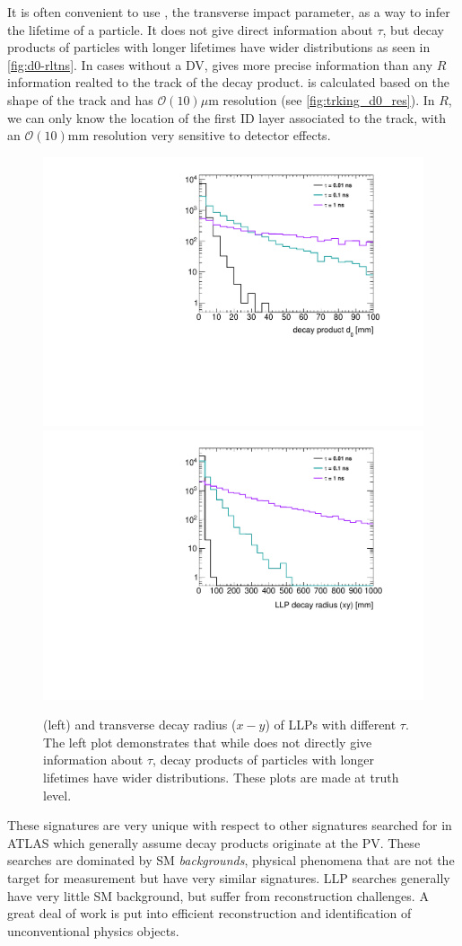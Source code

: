 It is often convenient to use \dzero, the transverse impact parameter, as a way to infer the lifetime of a particle. It does not give direct information about $\tau$, but decay products of particles with longer lifetimes have wider \dzero distributions as seen in \autoref{fig:d0-rltns}. In cases without a \ac{DV}, \dzero gives more precise information than any $R$ information realted to the track of the decay product. \dzero is calculated based on the shape of the track and has $\mathcal{O}(10)\mu \textrm{m}$ resolution (see \autoref{fig:trking_d0_res}). In $R$, we can only know the location of the first \ac{ID} layer associated to the track, with an $\mathcal{O}(10)\textrm{mm}$ resolution very sensitive to detector effects.


\begin{figure}[htbp]
\centering
\includegraphics[width=.48\textwidth]{figures/theory/signal_d0.pdf}
\includegraphics[width=.48\textwidth]{figures/theory/signal_rxy.pdf}
\caption{\dzero (left) and transverse decay radius ($x-y$) of \ac{LLP}s with different $\tau$. The left plot demonstrates that while \dzero does not directly give information about $\tau$, decay products of particles with longer lifetimes have wider \dzero distributions. These plots are made at truth level.}
\label{fig:d0-rltns}
\end{figure}


These signatures are very unique with respect to other signatures searched for in \ac{ATLAS} which generally assume decay products originate at the \ac{PV}. These searches are dominated by \ac{SM} \emph{backgrounds}, physical phenomena that are not the target for measurement but have very similar signatures. \ac{LLP} searches generally have very little \ac{SM} background, but suffer from reconstruction challenges. A great deal of work is put into efficient reconstruction and identification of unconventional physics objects.

